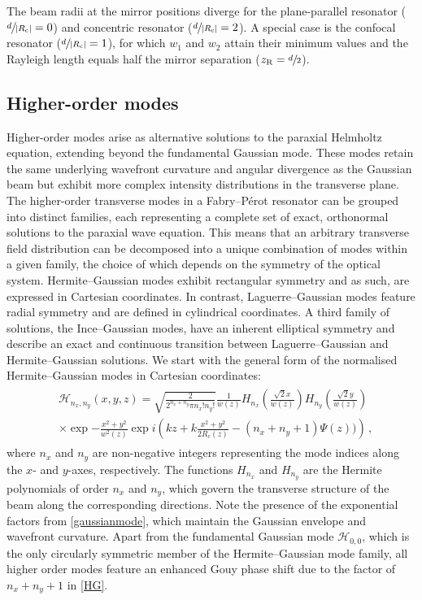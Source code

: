 \documentclass[../Thesis-IJspeert.tex]{subfiles}
\begin{document}
The beam radii at the mirror positions diverge for the plane-parallel resonator ($\sfrac{d}{\lvert R_\mathrm{c} \rvert}=0$) and concentric resonator ($\sfrac{d}{\lvert R_\mathrm{c} \rvert}=2$). A special case is the confocal resonator ($\sfrac{d}{\lvert R_\mathrm{c} \rvert}=1$), for which $w_1$ and $w_2$ attain their minimum values and the Rayleigh length equals half the mirror separation ($z_\mathrm{R}=\sfrac{d}{2}$).

\subsection{Higher-order modes}
\label{higerordermodesection}
Higher-order modes arise as alternative solutions to the paraxial Helmholtz equation, extending beyond the fundamental Gaussian mode. These modes retain the same underlying wavefront curvature and angular divergence as the Gaussian beam but exhibit more complex intensity distributions in the transverse plane. The higher-order transverse modes in a Fabry--Pérot resonator can be grouped into distinct families, each representing a complete set of exact, orthonormal solutions to the paraxial wave equation. This means that an arbitrary transverse field distribution can be decomposed into a unique combination of modes within a given family, the choice of which depends on the symmetry of the optical system. Hermite--Gaussian modes exhibit rectangular symmetry and as such, are expressed in Cartesian coordinates. In contrast, Laguerre--Gaussian modes feature radial symmetry and are defined in cylindrical coordinates. A third family of solutions, the Ince--Gaussian modes, have an inherent elliptical symmetry and describe an exact and continuous transition between Laguerre--Gaussian and Hermite--Gaussian solutions. We start with the general form of the normalised Hermite--Gaussian modes in Cartesian coordinates:
\begin{align}
\label{HG}
\begin{split}
&\mathcal{H}_{n_x,n_y}(x, y, z) = \sqrt{\frac{2}{ 2^{n_x+n_y} \pi n_x!n_y!}} \frac{1}{w(z)}H_{n_x}\left(\frac{\sqrt{2}x}{w(z)}\right) H_{n_y}\left(\frac{\sqrt{2}y}{w(z)}\right)\\ &\times\exp{-\frac{x^2 + y^2}{w^2(z)}} \exp{ i\left(kz + k\frac{x^2+y^2}{2R_\mathrm{c}(z)} - (n_x+n_y+1)\Psi(z))\right) } \,,
\end{split}
\end{align}
where $n_x$ and $n_y$ are non-negative integers representing the mode indices along the $x$- and $y$-axes, respectively. The functions $H_{n_x}$ and $H_{n_y}$ are the Hermite polynomials of order $n_x$ and $n_y$, which govern the transverse structure of the beam along the corresponding directions. Note the presence of the exponential factors from \autoref{gaussianmode}, which maintain the Gaussian envelope and wavefront curvature. Apart from the fundamental Gaussian mode $\mathcal{H}_{0,0}$, which is the only circularly symmetric member of the Hermite--Gaussian mode family, all higher order modes feature an enhanced Gouy phase shift due to the factor of $n_x+n_y+1$ in \autoref{HG}.
\end{document}
